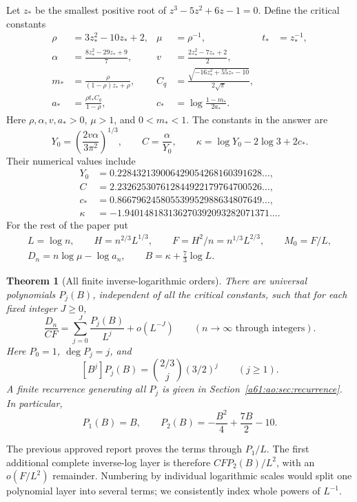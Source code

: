\documentclass[11pt,letterpaper]{article}
\numberwithin{equation}{section}
\newtheorem{theorem}{Theorem}[section]
\theoremstyle{remark}\newtheorem{remark}[theorem]{Remark}
\begin{document}
Let $z_*$ be the smallest positive root of
$z^3-5z^2+6z-1=0$. Define the critical constants
\begin{align*}
 \rho&=3z_*^2-10z_*+2,&\mu&=\rho^{-1},&t_*&=z_*^{-1},\\
 \alpha&=\frac{8z_*^2-29z_*+9}{7},&
 v&=\frac{2z_*^2-7z_*+2}{2},\\
 m_*&=\frac{\rho}{(1-\rho)z_*+\rho},&
 C_q&=\frac{\sqrt{-16z_*^2+55z_*-10}}{2\sqrt\pi},\\
 a_*&=\frac{\rho t_* C_q}{1-\rho},&
 c_*&=\log\frac{1-m_*}{2a_*}.
\end{align*}
Here $\rho,\alpha,v,a_*>0$, $\mu>1$, and $0<m_*<1$.
The constants in the answer are
\begin{equation}\label{a61:ao:eq:constants}
 Y_0=\left(\frac{2v\alpha}{3\pi^2}\right)^{1/3},\qquad
 C=\frac{\alpha}{Y_0},\qquad
 \kappa=\log Y_0-2\log3+2c_*.
\end{equation}
Their numerical values include
\begin{align*}
 Y_0&=0.228432139006429054268160391628\ldots,\\
 C&=2.232625307612844922179764700526\ldots,\\
 c_*&=0.866796245805539952988634807649\ldots,\\
 \kappa&=-1.940148183136270392093282071371\ldots.
\end{align*}
For the rest of the paper put
\begin{gather*}
 L=\log n,\qquad H=n^{2/3}L^{1/3},\qquad
 F=H^2/n=n^{1/3}L^{2/3},\qquad M_0=F/L,\\
 D_n=n\log\mu-\log a_n,\qquad
 B=\kappa+\tfrac73\log L.
\end{gather*}

\begin{theorem}[All finite inverse-logarithmic orders]\label{a61:ao:thm:main}
There are universal polynomials $P_j(B)$, independent of all the
critical constants, such that for each fixed integer $J\ge0$,
\begin{equation}\label{a61:ao:eq:main}
 \frac{D_n}{CF}=\sum_{j=0}^{J}\frac{P_j(B)}{L^j}+o(L^{-J})
 \qquad(n\longrightarrow\infty\text{ through integers}).
\end{equation}
Here $P_0=1$, $\deg P_j=j$, and
\[
 [B^j]P_j(B)=\binom{2/3}{j}(3/2)^j\qquad(j\ge1).
\]
A finite recurrence generating all $P_j$ is given in
Section~\ref{a61:ao:sec:recurrence}. In particular,
\[
 P_1(B)=B,\qquad P_2(B)=-\frac{B^2}{4}+\frac{7B}{2}-10.
\]
\end{theorem}
The previous approved report proves the terms through $P_1/L$.
The first additional complete inverse-log layer is therefore
$CFP_2(B)/L^2$, with an $o(F/L^2)$ remainder. Numbering by individual
logarithmic scales would split one polynomial layer into several terms;
we consistently index whole powers of $L^{-1}$.
\end{document}
